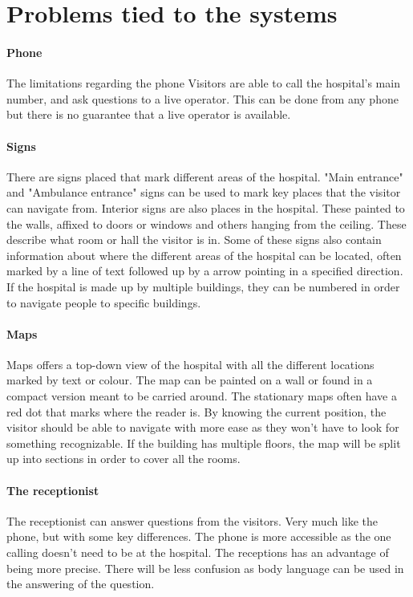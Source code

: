 \section{Problems tied to the systems} %
\label{sec:Problems_tied_to_the_systems}

\paragraph{Phone}
The limitations regarding the phone 
Visitors are able to call the hospital's main number, and ask questions to a live operator. This can be done from any phone but there is no guarantee that a live operator is available.

\paragraph{Signs}
There are signs placed that mark different areas of the hospital. "Main entrance" and "Ambulance entrance" signs can be used to mark key places that the visitor can navigate from\cite{art_Osborne}.
Interior signs are also places in the hospital. These painted to the walls, affixed to doors or windows and others hanging from the ceiling. These describe what room or hall the visitor is in. Some of these signs also contain information about where the different areas of the hospital can be located, often marked by a line of text followed up by a arrow pointing in a specified direction. If the hospital is made up by multiple buildings, they can be numbered in order to navigate people to specific buildings.

\paragraph{Maps}
Maps offers a top-down view of the hospital with all the different locations marked by text or colour\cite{art_Osborne}. The map can be painted on a wall or found in a compact version meant to be carried around. The stationary maps often have a red dot that marks where the reader is. By knowing the current position, the visitor should be able to navigate with more ease as they won't have to look for something recognizable. If the building has multiple floors, the map will be split up into sections in order to cover all the rooms.

\paragraph{The receptionist}
The receptionist can answer questions from the visitors. Very much like the phone, but with some key differences. The phone is more accessible as the one calling doesn't need to be at the hospital. The receptions has an advantage of being more precise. There will be less confusion as body language can be used in the answering of the question.


